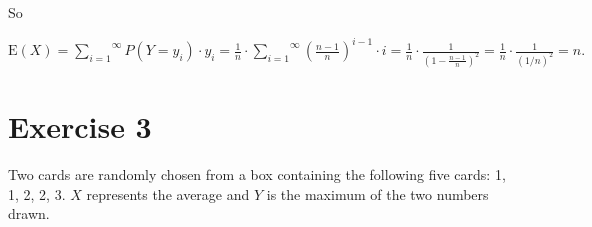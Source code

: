 \documentclass[12pt,thmsa]{article}\usepackage[]{graphicx}\usepackage[]{color}
\begin{document}
\begin{enumerate}
\begin{enumerate}
So
\begin{center}
$\mbox{E}(X) = \overset{\infty}{\underset{i=1}{\sum}}P(Y=y_i)\cdot y_i = \frac{1}{n}\cdot \overset{\infty}{\underset{i=1}{\sum}}(\frac{n-1}{n})^{i-1}\cdot i=\frac{1}{n}\cdot \frac{1}{(1-\frac{n-1}{n})^2}=\frac{1}{n}\cdot \frac{1}{(1/n)^2}=n.$
\end{center}

\end{enumerate}
\end{enumerate}


\section*{Exercise 3} %

Two cards are randomly chosen from a box containing the following five cards: 1, 1, 2, 2, 3. $X$ represents the average and $Y$ is the maximum of the two numbers drawn.
\end{document}
